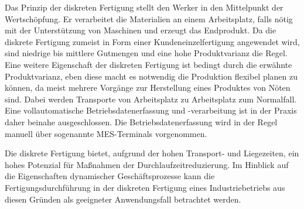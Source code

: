 Das Prinzip der diskreten Fertigung stellt den Werker in den Mittelpunkt der Wertschöpfung. 
Er verarbeitet die Materialien an einem Arbeitsplatz, falls nötig mit der Unterstützung von Maschinen und erzeugt das Endprodukt. 
\cite{Gerberich.2011}
Da die diskrete Fertigung zumeist in Form einer Kundeneinzelfertigung angewendet wird, sind niedrige bis mittlere Gutmengen und eine hohe Produktvarianz die Regel. 
Eine weitere Eigenschaft der diskreten Fertigung ist bedingt durch die erwähnte Produktvarianz, eben diese macht es notwendig die Produktion flexibel planen zu können, da meist mehrere Vorgänge zur Herstellung eines Produktes von Nöten sind.
Dabei werden Transporte von Arbeitsplatz zu Arbeitsplatz zum Normalfall.
Eine vollautomatische Betriebsdatenerfassung und -verarbeitung ist in der Praxis daher beinahe ausgeschlossen.
Die Betriebsdatenerfassung wird in der Regel manuell über sogenannte \ac{MES}-Terminals vorgenommen.
\cite{Gerberich.2011}

Die diskrete Fertigung bietet, aufgrund der hohen Transport- und Liegezeiten, ein hohes Potenzial für Maßnahmen der Durchlaufzeitreduzierung.
Im Hinblick auf die Eigenschaften dynamischer Geschäftsprozesse kann die Fertigungsdurchführung in der diskreten Fertigung eines Industriebetriebs aus diesen Gründen als geeigneter Anwendungsfall betrachtet werden.  

